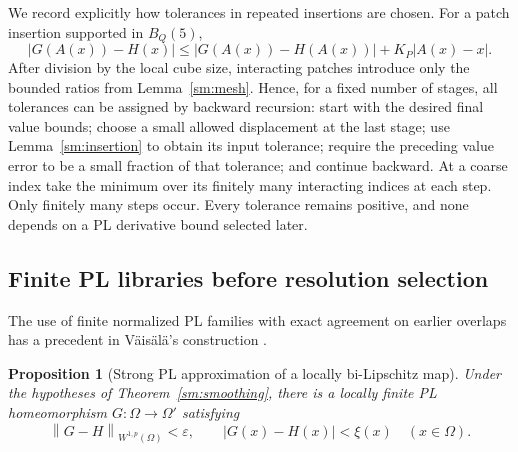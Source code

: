 \documentclass[11pt]{article}
\numberwithin{equation}{section}
\newtheorem{proposition}[theorem]{Proposition}
\theoremstyle{definition}
\theoremstyle{remark}
\newcommand{\eps}{\varepsilon}
\newcommand{\norm}[1]{\left\lVert #1\right\rVert}
\begin{document}
We record explicitly how tolerances in repeated insertions are chosen.
For a patch insertion supported in $B_Q(5)$,
\begin{equation}
 \label{sm:value-update}
 |G(A(x))-H(x)|
 \le |G(A(x))-H(A(x))|+K_P|A(x)-x|.
\end{equation}
After division by the local cube size, interacting patches introduce
only the bounded ratios from Lemma~\ref{sm:mesh}.  Hence, for a fixed
number of stages, all tolerances can be assigned by backward
recursion: start with the desired final value bounds; choose a small
allowed displacement at the last stage; use
Lemma~\ref{sm:insertion} to obtain its input tolerance; require the
preceding value error to be a small fraction of that tolerance; and
continue backward.  At a coarse index take the minimum over its
finitely many interacting indices at each step.  Only finitely many
steps occur.  Every tolerance remains positive, and none depends on a
PL derivative bound selected later.

\subsection{Finite PL libraries before resolution selection}

The use of finite normalized PL families with exact agreement on
earlier overlaps has a precedent in V\"ais\"al\"a's construction
\cite[Sections~2.7--2.11]{Vaisala1977}.

\begin{proposition}[Strong PL approximation of a locally bi-Lipschitz map]
\label{sm:bilip-pl}
Under the hypotheses of Theorem~\ref{sm:smoothing}, there is a
locally finite PL homeomorphism $G:\Omega\to\Omega'$ satisfying
\[
 \norm{G-H}_{W^{1,p}(\Omega)}<\eps,
 \qquad |G(x)-H(x)|<\xi(x)\quad(x\in\Omega).
\]
\end{proposition}
\end{document}
